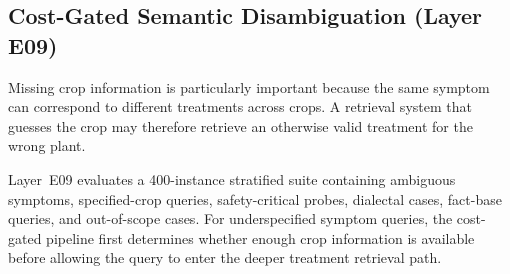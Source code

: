 \documentclass[a4paper,fleqn]{cas-dc}
\begin{document}
\begin{table}[pos=t]
\centering
\caption{Register-robust routing outcomes (Layer E21, $n=1{,}000$ per register $\times$ 2 routing paths; 95\% Wilson CIs).}
\label{tab:multimodal_robustness}
\small
{}
\end{table}


\subsection{Cost-Gated Semantic Disambiguation (Layer E09)}

Missing crop information is particularly important because the same symptom can correspond to different treatments across crops. A retrieval system that guesses the crop may therefore retrieve an otherwise valid treatment for the wrong plant.

Layer~E09 evaluates a 400-instance stratified suite containing ambiguous symptoms, specified-crop queries, safety-critical probes, dialectal cases, fact-base queries, and out-of-scope cases. For underspecified symptom queries, the cost-gated pipeline first determines whether enough crop information is available before allowing the query to enter the deeper treatment retrieval path.
\end{document}
